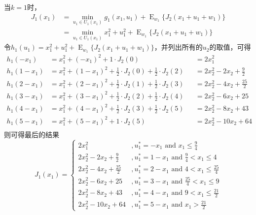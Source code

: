 \documentclass{article}
\begin{document}
\begin{enumerate}[(c)]
        当$k=1$时，
        \begin{equation}
            \begin{split}
                J_1(x_1)&=\min_{u_1\in U_1(x_1)}g_1(x_1,u_1)+\mathop{E}_{w_1}\big\{J_2(x_1+u_1+w_1)\big\}\\
                &=\min_{u_1\in U_1(x_1)}x_1^2+u_1^2+\mathop{E}_{w_1}\big\{J_2(x_1+u_1+w_1)\big\}
            \end{split}
        \end{equation}
        令$h_1(u_1)=x_1^2+u_1^2+\mathop{E}_{w_1}\big\{J_2(x_1+u_1+w_1)\big\}$，并列出所有的$u_2$的取值，可得
        \begin{equation}
            \begin{aligned}
                h_1(-x_1)&=x_1^2+(-x_1)^2+1\cdot J_2(0)&&=2x_1^2\\
                h_1(1-x_1)&=x_1^2+(1-x_1)^2+\frac{1}{2}\cdot J_2(0)+\frac{1}{2}\cdot J_2(2)&&=2x_2^2-2x_2+\frac{9}{2}\\
                h_1(2-x_1)&=x_1^2+(2-x_1)^2+\frac{1}{2}\cdot J_2(1)+\frac{1}{2}\cdot J_2(3)&&=2x_2^2-4x_2+\frac{25}{2}\\
                h_1(3-x_1)&=x_1^2+(3-x_1)^2+\frac{1}{2}\cdot J_2(2)+\frac{1}{2}\cdot J_2(4)&&=2x_2^2-6x_2+25\\
                h_1(4-x_1)&=x_1^2+(4-x_1)^2+\frac{1}{2}\cdot J_2(3)+\frac{1}{2}\cdot J_2(5)&&=2x_2^2-8x_2+43\\
                h_1(5-x_1)&=x_1^2+(5-x_1)^2+1\cdot J_2(5)&&=2x_2^2-10x_2+64\\
            \end{aligned}
        \end{equation}
        则可得最后的结果
        \begin{equation}
            J_1(x_1)=
            \begin{cases}
                2x_1^2 &, u_1^*=-x_1\text{ and }x_1\leq\frac{9}{4}\\
                2x_2^2-2x_2+\frac{9}{2} &, u_1^*=1-x_1\text{ and }\frac{9}{4}<x_1\leq 4\\
                2x_2^2-4x_2+\frac{25}{2} &, u_1^*=2-x_1\text{ and }4<x_1\leq\frac{25}{4}\\
                2x_2^2-6x_2+25 &, u_1^*=3-x_1\text{ and }\frac{25}{4}<x_1\leq 9\\
                2x_2^2-8x_2+43 &, u_1^*=4-x_1\text{ and }9<x_1\leq\frac{21}{2}\\
                2x_2^2-10x_2+64 &, u_1^*=5-x_1\text{ and }x_1>\frac{21}{2}
            \end{cases}
        \end{equation}


\end{enumerate}
\end{document}
